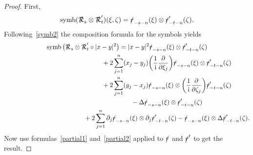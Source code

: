 \documentclass[10pt,a4paper]{amsart}
\DeclareMathOperator{\symb}{symb}
\newcommand{\fsl}[1]{{\slashed{#1}}} %
\numberwithin{equation}{section}
\begin{document}
\begin{proof}
First,
\begin{gather*}
\symb(\fsl{\mathcal R}_s\otimes \fsl{\mathcal R}'_t)(\xi,\zeta) = \fsl{r}_{-s-n} (\xi)\otimes \fsl{r}'_{-t-n}(\zeta) .
\end{gather*}
Following~\eqref{symb2} the composition formula for the symbols yields
\begin{gather*}
\symb\big(\fsl{\mathcal R}_s\otimes \fsl{\mathcal R}'_t\circ \vert x-y\vert^2\big)
 = \vert x-y\vert^2\fsl{r}_{-s-n}(\xi)\otimes \fsl{r}'_{-t-n}(\zeta)
\\ \hphantom{\symb\big(\fsl{\mathcal R}_s\otimes \fsl{\mathcal R}'_t\circ \vert x-y\vert^2\big) =}
{}+ 2\sum_{j=1}^n (x_j-y_j)\bigg(\frac{1}{\rm i}\frac{\partial}{\partial \xi_j}\bigg) \fsl{r}_{-s-n}(\xi)\otimes \fsl{r}'_{-t-n}(\zeta)
\\ \hphantom{\symb\big(\fsl{\mathcal R}_s\otimes \fsl{\mathcal R}'_t\circ \vert x-y\vert^2\big) =}
{}+2\sum_{j=1}^n (y_j-x_j) \fsl{r}_{-s-n}(\xi)\otimes \bigg(\frac{1}{\rm i}\frac{\partial}{\partial \zeta_j} \bigg)\fsl{r}'_{-t-n}(\zeta)
\\ \hphantom{\symb\big(\fsl{\mathcal R}_s\otimes \fsl{\mathcal R}'_t\circ \vert x-y\vert^2\big) =}
{}-\Delta \fsl{r}_{-s-n}(\xi)\otimes \fsl{r}'_{-t-n}(\zeta)
\\ \hphantom{\symb\big(\fsl{\mathcal R}_s\otimes \fsl{\mathcal R}'_t\circ \vert x-y\vert^2\big) =}
{}+2\sum_{j=1}^n \partial_j\fsl{r}_{-s-n}(\xi)\otimes \partial_j \fsl{r}'_{-t-n}(\zeta)- \fsl{r}_{-s-n}(\xi)\otimes \Delta \fsl{r}'_{-t-n}(\zeta).
\end{gather*}
Now use formulas~\eqref{partial1} and~\eqref{partial2} applied to $\fsl{r} $ and $ \fsl{r}'$ to get the result.
\end{proof}
\end{document}
